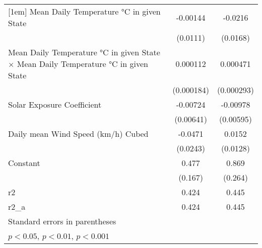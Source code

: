 {\begin{tabular}{l*{2}{c}}
[1em]
Mean Daily Temperature °C in given State&    -0.00144         &     -0.0216         \\
                    &    (0.0111)         &    (0.0168)         \\
[1em]
Mean Daily Temperature °C in given State $\times$ Mean Daily Temperature °C in given State&    0.000112         &    0.000471         \\
                    &  (0.000184)         &  (0.000293)         \\
[1em]
Solar Exposure Coefficient&    -0.00724         &    -0.00978         \\
                    &   (0.00641)         &   (0.00595)         \\
[1em]
Daily mean Wind Speed (km/h) Cubed&     -0.0471         &      0.0152         \\
                    &    (0.0243)         &    (0.0128)         \\
[1em]
Constant            &       0.477\sym{*}  &       0.869\sym{*}  \\
                    &     (0.167)         &     (0.264)         \\
\hline
r2                  &       0.424         &       0.445         \\
r2\_a                &       0.424         &       0.445         \\
\hline\hline
\multicolumn{3}{l}{\footnotesize Standard errors in parentheses}\\
\multicolumn{3}{l}{\footnotesize \sym{*} \(p<0.05\), \sym{**} \(p<0.01\), \sym{***} \(p<0.001\)}\\
\end{tabular}
}
